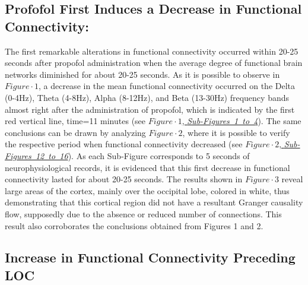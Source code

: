 \documentclass[twoside]{article}
\begin{document}
\begin{figure}[!h]
\label{fig:fig}
\hypertarget{FIGURE1}{}
\end{figure}


\begin{multicols}{2}


\subsection{Profofol First Induces a Decrease in Functional Connectivity:}


The first remarkable alterations in functional connectivity occurred within 20-25 seconds after propofol administration when the average degree of functional brain networks diminished for about 20-25 seconds. As it is possible to observe in \hyperlink{FIGURE1}{$Figure \cdot 1$}, a decrease in the mean functional connectivity occurred on the Delta (0-4Hz), Theta (4-8Hz), Alpha (8-12Hz), and Beta (13-30Hz) frequency bands almost right after the administration of propofol, which is indicated by the first red vertical line, time=11 minutes (see \hyperlink{FIGURE1}{$Figure \cdot 1$, \mbox{\textit{Sub-Figures 1 to 4}}}). The same conclusions can be drawn by analyzing \hyperlink{FIGURE2}{$Figure \cdot 2$}, where it is possible to verify the respective period when functional connectivity decreased (see \hyperlink{FIGURE2}{$Figure \cdot 2$, \mbox{\textit{Sub-Figures 12 to 16}}}). As each Sub-Figure corresponds to 5 seconds of neurophysiological records, it is evidenced that this first decrease in functional connectivity lasted for about 20-25 seconds. The results shown in \hyperlink{FIGURE3}{$Figure \cdot 3$} reveal large areas of the cortex, mainly over the occipital lobe, colored in white, thus demonstrating that this cortical region did not have a resultant Granger causality flow, supposedly due to the absence or reduced number of connections. This result also corroborates the conclusions obtained from Figures 1 and 2.


\subsection{Increase in Functional Connectivity Preceding LOC}



\end{multicols}
\end{document}
